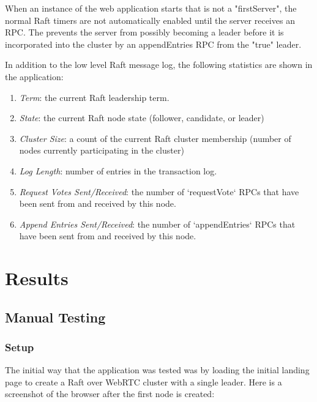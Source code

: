 \documentclass{acmtog} %
\begin{document}
When an instance of the web application starts that is not
a "firstServer", the normal Raft timers are not automatically enabled
until the server receives an RPC. The prevents the server from
possibly becoming a leader before it is incorporated into the cluster
by an appendEntries RPC from the "true" leader.

In addition to the low level Raft message log, the following
statistics are shown in the application:

\begin{enumerate}
\item \emph{Term}: the current Raft leadership term.
\item \emph{State}: the current Raft node state (follower, candidate, or leader)
\item \emph{Cluster Size}: a count of the current Raft cluster membership (number of nodes currently participating in the cluster)
\item \emph{Log Length}: number of entries in the transaction log.
\item \emph{Request Votes Sent/Received}: the number of `requestVote` RPCs that have been sent from and received by this node.
\item \emph{Append Entries Sent/Received}: the number of `appendEntries` RPCs that have been sent from and received by this node.
\end{enumerate}

\section{Results}

\subsection{Manual Testing}

\subsubsection{Setup}

The initial way that the application was tested was by loading the
initial landing page to create a Raft over WebRTC cluster with
a single leader. Here is a screenshot of the browser after the first
node is created:
\end{document}
